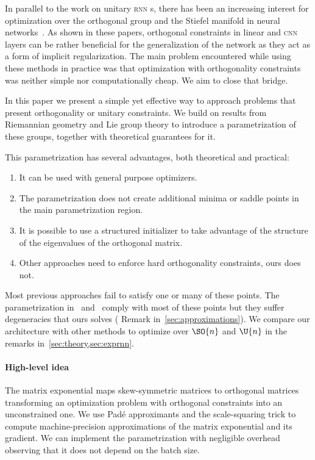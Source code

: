 In parallel to the work on unitary \textsc{rnn} s, there has been an increasing interest for optimization over the orthogonal group and the Stiefel manifold in neural networks~\cite{harandi2016generalized,ozay2016optimization,huang2017orthogonal,bansal2018can}. As shown in these papers, orthogonal constraints in linear and \textsc{cnn} layers can be rather beneficial for the generalization of the network as they act as a form of implicit regularization. The main problem encountered while using these methods in practice was that optimization with orthogonality constraints was neither simple nor computationally cheap. We aim to close that bridge.

In this paper we present a simple yet effective way to approach problems that present orthogonality or unitary constraints. We build on results from Riemannian geometry and Lie group theory to introduce a parametrization of these groups, together with theoretical guarantees for it.

This parametrization has several advantages, both theoretical and practical:

\begin{enumerate}[itemsep=0mm]
    \item It can be used with general purpose optimizers.
    \item The parametrization does not create additional minima or saddle points in the main parametrization region.
    \item It is possible to use a structured initializer to take advantage of the structure of the eigenvalues of the orthogonal matrix.
    \item Other approaches need to enforce hard orthogonality constraints, ours does not.
\end{enumerate}

Most previous approaches fail to satisfy one or many of these points. The parametrization in~\cite{helfrich18a} and~\cite{maduranga2018complexur} comply with most of these points but they suffer degeneracies that ours solves (\cf{} Remark in~\ref{sec:approximations}). We compare our architecture with other methods to optimize over $\SO{n}$ and $\U{n}$ in the remarks in~\ref{sec:theory,sec:exprnn}.

\paragraph{High-level idea} The matrix exponential maps skew-symmetric matrices to orthogonal matrices transforming an optimization problem with orthogonal constraints into an unconstrained one. We use Pad\'e approximants and the scale-squaring trick to compute machine-precision approximations of the matrix exponential and its gradient. We can implement the parametrization with negligible overhead observing that it does not depend on the batch size.

